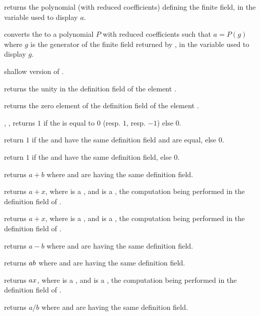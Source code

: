  returns the polynomial (with reduced 
coefficients) defining the finite field, in the variable used to display $a$.

 converts the   to a polynomial
$P$ with reduced  coefficients such that $a=P(g)$ where $g$ is the
generator of the finite field returned by , in the variable used to
display $g$.

 shallow version of .

 returns the unity in the definition field of the
 element .

 returns the zero element of the definition field of
the  element .

, ,  returns $1$ if the   is equal to $0$ (resp. $1$, resp.
$-1$) else $0$.

 return $1$ if the   and
 have the same definition field and are equal, else $0$.

 return $1$ if the   and
 have the same definition field, else $0$.

 returns $a+b$ where  and  are
 having the same definition field.

 returns $a+x$, where  is a
, and  is a , the computation being
performed in the definition field of .

 returns $a+x$, where  is a
, and  is a , the computation being
performed in the definition field of .

 returns $a-b$ where  and  are
 having the same definition field.

 returns $a\*b$ where  and  are
 having the same definition field.

 returns $a\*x$, where  is a
, and  is a , the computation being
performed in the definition field of .

 returns $a/b$ where  and  are
 having the same definition field.

